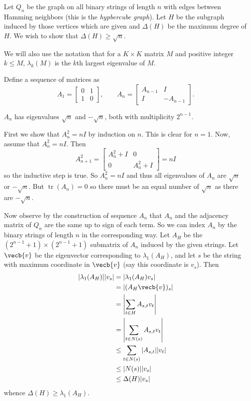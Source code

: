Let $Q_n$ be the graph on all binary strings of length $n$ with edges between Hamming neighbors (this is the \emph{hypbercube graph}). Let $H$ be the subgraph induced by those vertices which are given and $\Delta(H)$ be the maximum degree of $H$. We wish to show that $\Delta(H)\geq\sqrt{n}$.

We will also use the notation that for a $K\times K$ matrix $M$ and positive integer $k\leq M$, $\lambda_k(M)$ is the $k$th largest eigenvalue of $M$.

Define a sequence of matrices as \[A_1=
\begin{bmatrix}
	0 & 1 \\
	1 & 0
\end{bmatrix}
,\qquad A_n=
\begin{bmatrix}
	A_{n-1} & I \\
	I & -A_{n-1}
\end{bmatrix}
.\]

\begin{claim}
$A_n$ has eigenvalues $\sqrt{n}$ and $-\sqrt{n}$, both with multiplicity $2^{n-1}$.
\end{claim}

\begin{lemmaproof}
First we show that $A_n^2=nI$ by induction on $n$. This is clear for $n=1$. Now, assume that $A_n^2=nI$. Then \[A_{n+1}^2=
\begin{bmatrix}
	A_n^2+I & 0 \\
	0 & A_n^2+I
\end{bmatrix}
=nI\] so the inductive step is true. So $A_n^2=nI$ and thus all eigenvalues of $A_n$ are $\sqrt{n}$ or $-\sqrt{n}$. But $\operatorname{tr}(A_n)=0$ so there must be an equal number of $\sqrt{n}$ as there are $-\sqrt{n}$.
\end{lemmaproof}

Now observe by the construction of sequence $A_n$ that $A_n$ and the adjacency matrix of $Q_n$ are the same up to sign of each term. So we can index $A_n$ by the binary strings of length $n$ in the corresponding way. Let $A_H$ be the $(2^{n-1}+1)\times(2^{n-1}+1)$ submatrix of $A_n$ induced by the given strings. Let $\vecb{v}$ be the eigenvector corresponding to $\lambda_1(A_H)$, and let $s$ be the string with maximum coordinate in $\vecb{v}$ (say this coordinate is $v_s$). Then
\begin{align*}
	|\lambda_1(A_H)||v_s|&=|\lambda_1(A_H)v_s|\\
	&=|(A_H\vecb{v})_s|\\
	&=\left|\sum_{t\in H}A_{s,t}v_t\right|\\
	&=\left|\sum_{t\in N(s)}A_{s,t}v_t\right|\\
	&\leq\sum_{t\in N(s)}|A_{s,t}||v_t|\\
	&\leq|N(s)||v_s|\\
	&\leq\Delta(H)|v_s|
\end{align*}
whence $\Delta(H)\geq\lambda_1(A_H)$.

